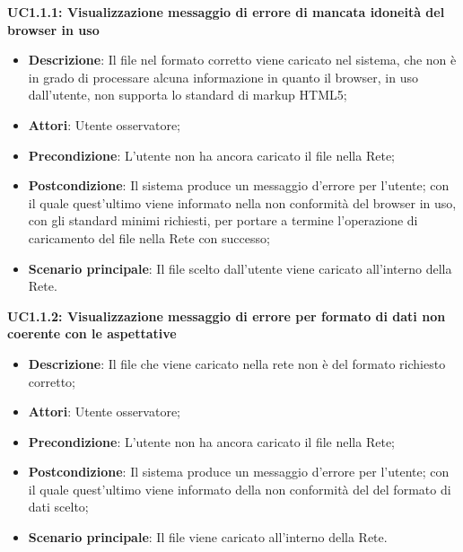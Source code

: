 \textbf{UC1.1.1: Visualizzazione messaggio di errore di mancata idoneità del browser in uso}\mbox{}
\label{UC1.1.1: Visualizzazione messaggio di errore di mancata idoneita del browser in uso}
\begin{itemize}
\item \textbf{Descrizione}: Il file nel formato corretto viene caricato nel sistema, che non \`e in grado di processare alcuna informazione in quanto il browser, in uso dall'utente, non supporta lo standard di markup HTML5;
\item \textbf{Attori}: Utente osservatore;
\item \textbf{Precondizione}: L'utente non ha ancora caricato il file nella Rete;
\item \textbf{Postcondizione}: Il sistema produce un messaggio d'errore per l'utente; con il quale quest'ultimo viene informato nella non conformit\`a del browser in uso, con gli standard minimi richiesti, per portare a termine l'operazione di caricamento del file nella Rete con successo;
\item \textbf{Scenario principale}: Il file scelto dall'utente viene caricato all'interno della Rete.
\end{itemize}


\textbf{UC1.1.2: Visualizzazione messaggio di errore per formato di dati non coerente con le aspettative}\mbox{}
\label{UC1.1.2 Visualizzazione messaggio di errore per formato di dati non coerente con le aspettative}
\begin{itemize}
\item \textbf{Descrizione}: Il file che viene caricato nella rete non \`e del formato richiesto corretto;
\item \textbf{Attori}: Utente osservatore;
\item \textbf{Precondizione}: L'utente non ha ancora caricato il file nella Rete;
\item \textbf{Postcondizione}: Il sistema produce un messaggio d'errore per l'utente; con il quale quest'ultimo viene informato della non conformit\`a del del formato di dati scelto;
\item \textbf{Scenario principale}: Il file viene caricato all'interno della Rete.
\end{itemize}


